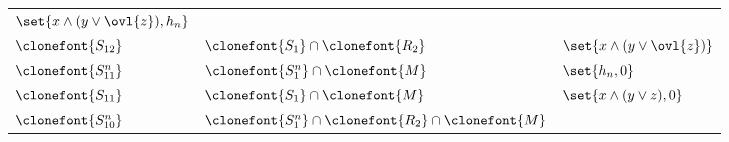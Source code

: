 \documentclass[11pt]{article}
\begin{document}
\begin{figure}[hbtp]
\begin{small}
\begin{longtable}[]{p{}p{}p{}}
\begin{minipage}[t]{0.38\columnwidth}
                \(\set{x \land (y \lor \ovl{z}), h_n}\)\strut
            \end{minipage}\tabularnewline
            \begin{minipage}[t]{0.12\columnwidth}\raggedright
                \(\clonefont{S_{12}}\)\strut
            \end{minipage} & \begin{minipage}[t]{0.41\columnwidth}\raggedright
                \(\clonefont{S_1} \cap \clonefont{R_2}\)\strut
            \end{minipage} & \begin{minipage}[t]{0.38\columnwidth}\raggedright
                \(\set{x \land (y \lor \ovl{z})}\)\strut
            \end{minipage}\tabularnewline
            \begin{minipage}[t]{0.12\columnwidth}\raggedright
                \(\clonefont{S_{11}^n}\)\strut
            \end{minipage} & \begin{minipage}[t]{0.41\columnwidth}\raggedright
                \(\clonefont{S_1^n} \cap \clonefont{M}\)\strut
            \end{minipage} & \begin{minipage}[t]{0.38\columnwidth}\raggedright
                \(\set{h_n, 0}\)\strut
            \end{minipage}\tabularnewline
            \begin{minipage}[t]{0.12\columnwidth}\raggedright
                \(\clonefont{S_{11}}\)\strut
            \end{minipage} & \begin{minipage}[t]{0.41\columnwidth}\raggedright
                \(\clonefont{S_1} \cap \clonefont{M}\)\strut
            \end{minipage} & \begin{minipage}[t]{0.38\columnwidth}\raggedright
                \(\set{x \land (y \lor z), 0}\)\strut
            \end{minipage}\tabularnewline
            \begin{minipage}[t]{0.12\columnwidth}\raggedright
                \(\clonefont{S_{10}^n}\)\strut
            \end{minipage} & \begin{minipage}[t]{0.41\columnwidth}\raggedright
                \(\clonefont{S_1^n} \cap \clonefont{R_2} \cap \clonefont{M}\)\strut
            \end{minipage} & \begin{minipage}[t]{0.38\columnwidth}\raggedright

\end{minipage}
\end{longtable}
\end{small}
\end{figure}
\end{document}

